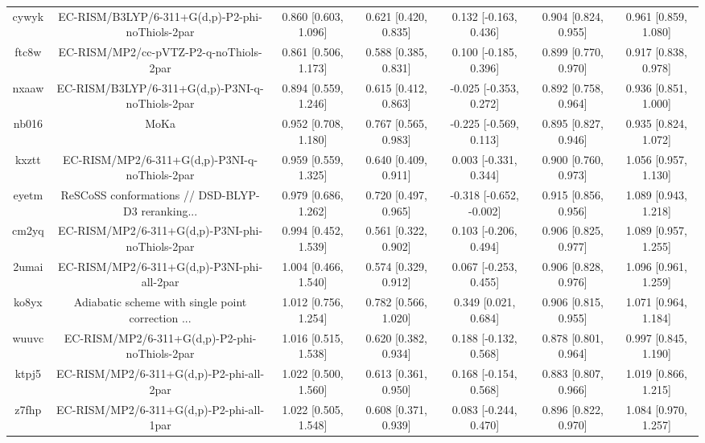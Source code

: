 \documentclass{article}
\begin{document}
\begin{center}
\begin{longtable}{|ccccccc|}
 cywyk &    EC-RISM/B3LYP/6-311+G(d,p)-P2-phi-noThiols-2par &  0.860 [0.603, 1.096] &  0.621 [0.420, 0.835] &    0.132 [-0.163, 0.436] &  0.904 [0.824, 0.955] &   0.961 [0.859, 1.080] \\
 ftc8w &             EC-RISM/MP2/cc-pVTZ-P2-q-noThiols-2par &  0.861 [0.506, 1.173] &  0.588 [0.385, 0.831] &    0.100 [-0.185, 0.396] &  0.899 [0.770, 0.970] &   0.917 [0.838, 0.978] \\
 nxaaw &    EC-RISM/B3LYP/6-311+G(d,p)-P3NI-q-noThiols-2par &  0.894 [0.559, 1.246] &  0.615 [0.412, 0.863] &   -0.025 [-0.353, 0.272] &  0.892 [0.758, 0.964] &   0.936 [0.851, 1.000] \\
 nb016 &                                               MoKa &  0.952 [0.708, 1.180] &  0.767 [0.565, 0.983] &   -0.225 [-0.569, 0.113] &  0.895 [0.827, 0.946] &   0.935 [0.824, 1.072] \\
 kxztt &      EC-RISM/MP2/6-311+G(d,p)-P3NI-q-noThiols-2par &  0.959 [0.559, 1.325] &  0.640 [0.409, 0.911] &    0.003 [-0.331, 0.344] &  0.900 [0.760, 0.973] &   1.056 [0.957, 1.130] \\
 eyetm &  ReSCoSS conformations // DSD-BLYP-D3 reranking... &  0.979 [0.686, 1.262] &  0.720 [0.497, 0.965] &  -0.318 [-0.652, -0.002] &  0.915 [0.856, 0.956] &   1.089 [0.943, 1.218] \\
 cm2yq &    EC-RISM/MP2/6-311+G(d,p)-P3NI-phi-noThiols-2par &  0.994 [0.452, 1.539] &  0.561 [0.322, 0.902] &    0.103 [-0.206, 0.494] &  0.906 [0.825, 0.977] &   1.089 [0.957, 1.255] \\
 2umai &         EC-RISM/MP2/6-311+G(d,p)-P3NI-phi-all-2par &  1.004 [0.466, 1.540] &  0.574 [0.329, 0.912] &    0.067 [-0.253, 0.455] &  0.906 [0.828, 0.976] &   1.096 [0.961, 1.259] \\
 ko8yx &  Adiabatic scheme with single point correction ... &  1.012 [0.756, 1.254] &  0.782 [0.566, 1.020] &     0.349 [0.021, 0.684] &  0.906 [0.815, 0.955] &   1.071 [0.964, 1.184] \\
 wuuvc &      EC-RISM/MP2/6-311+G(d,p)-P2-phi-noThiols-2par &  1.016 [0.515, 1.538] &  0.620 [0.382, 0.934] &    0.188 [-0.132, 0.568] &  0.878 [0.801, 0.964] &   0.997 [0.845, 1.190] \\
 ktpj5 &           EC-RISM/MP2/6-311+G(d,p)-P2-phi-all-2par &  1.022 [0.500, 1.560] &  0.613 [0.361, 0.950] &    0.168 [-0.154, 0.568] &  0.883 [0.807, 0.966] &   1.019 [0.866, 1.215] \\
 z7fhp &           EC-RISM/MP2/6-311+G(d,p)-P2-phi-all-1par &  1.022 [0.505, 1.548] &  0.608 [0.371, 0.939] &    0.083 [-0.244, 0.470] &  0.896 [0.822, 0.970] &   1.084 [0.970, 1.257] \\

\end{longtable}
\end{center}
\end{document}
